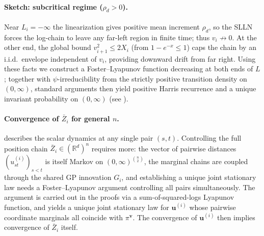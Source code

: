 \documentclass{article}
\newcommand{\RR}{\mathbb{R}}
\newcommand{\bZ}{\bar{Z}}
\newcommand{\bv}{\mathbf{v}}
\newcommand{\bu}{\mathbf{u}}
\begin{document}
\paragraph{Sketch: subcritical regime ($\rho_d > 0$).}
Near $L_i = -\infty$ the linearization gives positive mean increment $\rho_d$, so the SLLN forces the log-chain to leave any far-left region in finite time; thus $v_i \not\to 0$. At the other end, the global bound $v_{i+1}^2 \le 2 X_i$ (from $1 - e^{-x} \le 1$) caps the chain by an i.i.d.\ envelope independent of $v_i$, providing downward drift from far right. Using these facts we construct a Foster--Lyapunov function decreasing at both ends of $L$; together with $\psi$-irreducibility from the strictly positive transition density on $(0, \infty)$, standard arguments then yield positive Harris recurrence and a unique invariant probability on $(0, \infty)$ (see \cite{meyn1993markov}).

\paragraph{Convergence of $\bZ_i$ for general $n$.}
 describes the scalar dynamics at any single pair $(s, t)$. Controlling the full position chain $\bZ_i \in (\RR^d)^n$ requires more: the vector of pairwise distances $(u_{st}^{(i)})_{s<t}$ is itself Markov on $(0, \infty)^{\binom{n}{2}}$, the marginal chains are coupled through the shared GP innovation $G_i$, and establishing a unique joint stationary law needs a Foster--Lyapunov argument controlling all pairs simultaneously. The argument is carried out in the proofs via a sum-of-squared-logs Lyapunov function, and yields a unique joint stationary law for $\bu^{(i)}$ whose pairwise coordinate marginals all coincide with $\pi^{\bv}$. The convergence of $\bu^{(i)}$ then implies convergence of $\bZ_i$ itself.
\end{document}
